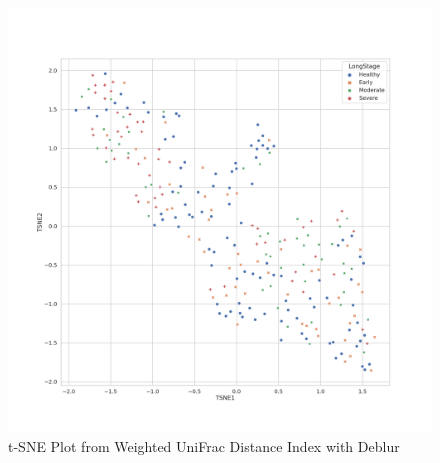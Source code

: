\documentclass[a4paper]{article}
\begin{document}
            \begin{figure}[p]
                \centering
                \includegraphics[width=0.6 \linewidth]{figures/BetaDiversity/Deblur.weighted_unifrac.png}
                \caption{t-SNE Plot from Weighted UniFrac Distance Index with Deblur}
                \label{fig:tsne-weighted-deblur}
            \end{figure}
\end{document}
